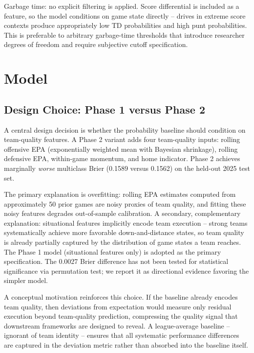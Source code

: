 \documentclass[12pt,a4paper]{article}
\begin{document}
Garbage time: no explicit filtering is applied. Score differential is included as a feature, so the model conditions on game state directly -- drives in extreme score contexts produce appropriately low TD probabilities and high punt probabilities. This is preferable to arbitrary garbage-time thresholds that introduce researcher degrees of freedom and require subjective cutoff specification.

\section{Model}
\label{sec:model}

\subsection{Design Choice: Phase 1 versus Phase 2}

A central design decision is whether the probability baseline should condition on team-quality features. A Phase 2 variant adds four team-quality inputs: rolling offensive EPA (exponentially weighted mean with Bayesian shrinkage), rolling defensive EPA, within-game momentum, and home indicator. Phase 2 achieves marginally \emph{worse} multiclass Brier (0.1589 versus 0.1562) on the held-out 2025 test set.

The primary explanation is overfitting: rolling EPA estimates computed from approximately 50 prior games are noisy proxies of team quality, and fitting these noisy features degrades out-of-sample calibration. A secondary, complementary explanation: situational features implicitly encode team execution -- strong teams systematically achieve more favorable down-and-distance states, so team quality is already partially captured by the distribution of game states a team reaches. The Phase 1 model (situational features only) is adopted as the primary specification. The 0.0027 Brier difference has not been tested for statistical significance via permutation test; we report it as directional evidence favoring the simpler model.

A conceptual motivation reinforces this choice. If the baseline already encodes team quality, then deviations from expectation would measure only residual execution beyond team-quality prediction, compressing the quality signal that downstream frameworks are designed to reveal. A league-average baseline -- ignorant of team identity -- ensures that all systematic performance differences are captured in the deviation metric rather than absorbed into the baseline itself.
\end{document}
